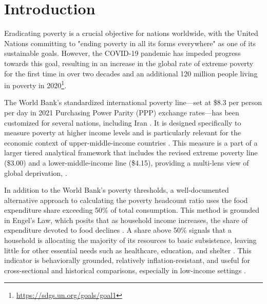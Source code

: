 \documentclass[12pt,a4paper]{article}
\begin{document}
	
\section{Introduction}
Eradicating poverty is a crucial objective for nations worldwide, with the United Nations committing to "ending poverty in all its forms everywhere" as one of its sustainable goals. However, the COVID-19 pandemic has impeded progress towards this goal, resulting in an increase in the global rate of extreme poverty for the first time in over two decades and an additional 120 million people living in poverty in 2020\footnote{\url{https://sdgs.un.org/goals/goal1}}.

The World Bank's standardized international poverty line—set at \$8.3 per person per day in 2021 Purchasing Power Parity (PPP) exchange rates—has been customized for several nations, including Iran \citep{worldbank2026iran}. It is designed specifically to measure poverty at higher income levels and is particularly relevant for the economic context of upper-middle-income countries \citep{Ferreira2016}. This measure is a part of a larger tiered analytical framework that includes the revised extreme poverty line (\$3.00) and a lower-middle-income line (\$4.15), providing a multi-lens view of global deprivation, \citep{Jolliffe2022}. 

In addition to the World Bank's poverty thresholds, a well-documented alternative approach to calculating the poverty headcount ratio uses the food expenditure share exceeding 50\% of total consumption. This method is grounded in Engel's Law, which posits that as household income increases, the share of expenditure devoted to food declines \citep{Engel1857}. A share above 50\% signals that a household is allocating the majority of its resources to basic subsistence, leaving little for other essential needs such as healthcare, education, and shelter \citep{Ravallion1992, Ravallion2011}. This indicator is behaviorally grounded, relatively inflation-resistant, and useful for cross-sectional and historical comparisons, especially in low-income settings \citep{Deaton1997}.
\end{document}
